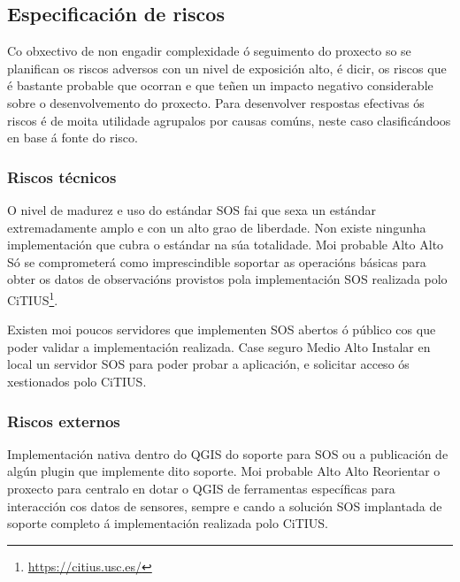 \subsection{Especificación de riscos}
Co obxectivo de non engadir complexidade ó seguimento do proxecto so se planifican os riscos adversos con un nivel de exposición alto, é dicir, os riscos que é bastante probable que ocorran e que teñen un impacto negativo considerable sobre o desenvolvemento do proxecto. Para desenvolver respostas efectivas ós riscos é de moita utilidade agrupalos por causas comúns, neste caso clasificándoos en base á fonte do risco.

\subsubsection{Riscos técnicos}
		  	{O nivel de madurez e uso do estándar SOS fai que sexa un estándar extremadamente amplo e con un alto grao de liberdade. Non existe ningunha implementación que cubra o estándar na súa totalidade.}
			{Moi probable} %
			{Alto} %
			{Alto} %
			{Só se comprometerá como imprescindible soportar as operacións básicas para obter os datos de observacións provistos pola implementación SOS realizada polo CiTIUS\footnote{\url{https://citius.usc.es/}}.}

		  	{Existen moi poucos servidores que implementen SOS abertos ó público cos que poder validar a implementación realizada.}
			{Case seguro} %
			{Medio} %
			{Alto} %
			{Instalar en local un servidor SOS para poder probar a aplicación, e solicitar acceso ós xestionados polo CiTIUS.}
			
\subsubsection{Riscos externos}
		  	{Implementación nativa dentro do QGIS do soporte para SOS ou a publicación de algún plugin que implemente dito soporte.}
			{Moi probable} %
			{Alto} %
			{Alto} %
			{Reorientar o proxecto para centralo en dotar o QGIS de ferramentas específicas para interacción cos datos de sensores, sempre e cando a solución SOS implantada de soporte completo á implementación realizada polo CiTIUS.}

